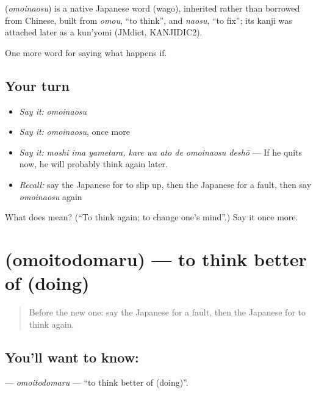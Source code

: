 \begin{cousinweb}
\textbf{} (\emph{omoinaosu}) is a native Japanese word (wago), inherited rather than borrowed from Chinese, built from \emph{omou}, \textquotedblleft{}to think\textquotedblright{}, and \emph{naosu}, \textquotedblleft{}to fix\textquotedblright{}; its kanji was attached later as a kun'yomi (JMdict, KANJIDIC2).
\end{cousinweb}

\begin{grammarlens}[title={What you've built}]
One more word for saying what happens if.
\end{grammarlens}

\subsection*{Your turn}
\begin{itemize}
\raggedright
  \item \emph{Say it:} \emph{omoinaosu}
  \item \emph{Say it:} \emph{omoinaosu}, once more
  \item \emph{Say it:} \emph{moshi ima yametara, kare wa ato de omoinaosu deshō} — If he quits now, he will probably think again later.
  \item \emph{Recall:} say the Japanese for to slip up, then the Japanese for a fault, then say \emph{omoinaosu} again
\end{itemize}

\begin{tcolorbox}[breakable,colback=teal!4,colframe=teal!35!black,title={Before you move on}]
What does  mean? (\textquotedblleft{}To think again; to change one's mind\textquotedblright{}.) Say it once more.
\end{tcolorbox}
\section[\texorpdfstring{\ja{おもいとどまる} (omoitodomaru)}{おもいとどまる (omoitodomaru)}]{ (omoitodomaru) — to think better of (doing)}

\label{lesson:JA-C519-omoitodomaru}



\begin{quote}
Before the new one: say the Japanese for a fault, then the Japanese for to think again.
\end{quote}

\subsection*{You'll want to know: }
\textbf{} — \emph{omoitodomaru} — \textquotedblleft{}to think better of (doing)\textquotedblright{}.

